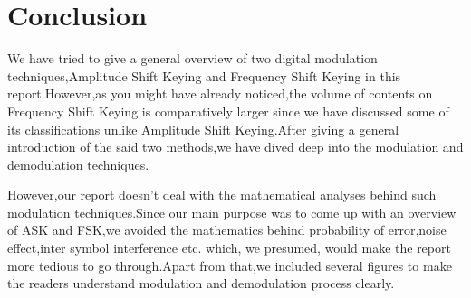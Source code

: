 \documentclass{report}
\begin{document}
	
\chapter{Conclusion}
\bigskip 
We have tried to give a general overview of two digital modulation techniques,Amplitude Shift Keying and Frequency Shift Keying in this report.However,as you might have already noticed,the volume of contents on Frequency Shift Keying is comparatively larger since we have discussed some of its classifications unlike Amplitude Shift Keying.After giving a general introduction of the said two methods,we have dived deep into the modulation and demodulation techniques.\bigskip 

However,our report doesn't deal with the mathematical analyses behind such modulation techniques.Since our main purpose was to come up with an overview of ASK and FSK,we avoided the mathematics behind probability of error,noise effect,inter symbol interference etc. which, we presumed, would make the report more tedious to go through.Apart from that,we included several figures to make the readers understand modulation and demodulation process clearly.   
\end{document}
